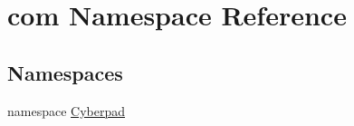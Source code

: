 \hypertarget{namespacecom}{
\section{com \-Namespace \-Reference}
\label{namespacecom}
}
\subsection*{\-Namespaces}
\begin{DoxyCompactItemize}
\item 
namespace \hyperlink{namespacecom_1_1_cyberpad}{\-Cyberpad}
\end{DoxyCompactItemize}
